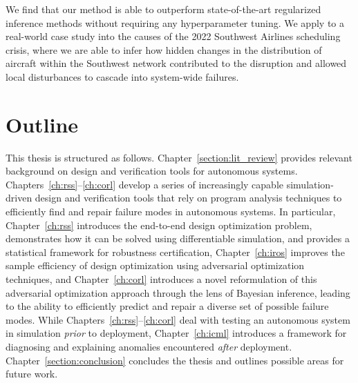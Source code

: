We find that our method is able to outperform state-of-the-art regularized inference methods without requiring any hyperparameter tuning. We apply \ouralg{} to a real-world case study into the causes of the 2022 Southwest Airlines scheduling crisis, where we are able to infer how hidden changes in the distribution of aircraft within the Southwest network contributed to the disruption and allowed local disturbances to cascade into system-wide failures.

\section{Outline}

This thesis is structured as follows. Chapter~\ref{section:lit_review} provides relevant background on design and verification tools for autonomous systems. Chapters~\ref{ch:rss}--\ref{ch:corl} develop a series of increasingly capable simulation-driven design and verification tools that rely on program analysis techniques to efficiently find and repair failure modes in autonomous systems. In particular, Chapter~\ref{ch:rss} introduces the end-to-end design optimization problem, demonstrates how it can be solved using differentiable simulation, and provides a statistical framework for robustness certification, Chapter~\ref{ch:iros} improves the sample efficiency of design optimization using adversarial optimization techniques, and Chapter~\ref{ch:corl} introduces a novel reformulation of this adversarial optimization approach through the lens of Bayesian inference, leading to the ability to efficiently predict and repair a diverse set of possible failure modes. While Chapters~\ref{ch:rss}--\ref{ch:corl} deal with testing an autonomous system in simulation \textit{prior} to deployment, Chapter~\ref{ch:icml} introduces a framework for diagnosing and explaining anomalies encountered \textit{after} deployment. Chapter~\ref{section:conclusion} concludes the thesis and outlines possible areas for future work.